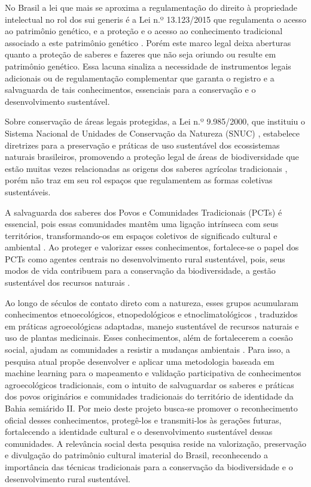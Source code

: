 No Brasil a lei que mais se aproxima a regulamentação do direito à propriedade intelectual no rol dos sui generis é a Lei n.º 13.123/2015 que regulamenta o acesso ao patrimônio genético, e a proteção e o acesso ao conhecimento tradicional associado a este patrimônio genético \cite{Brasil2015}. Porém este marco legal deixa aberturas quanto a proteção de saberes e fazeres que não seja oriundo ou resulte em patrimônio genético. Essa lacuna sinaliza a necessidade de instrumentos legais adicionais ou de regulamentação complementar que garanta o registro e a salvaguarda de tais conhecimentos, essenciais para a conservação e o desenvolvimento sustentável.

Sobre conservação de áreas legais protegidas, a Lei n.º 9.985/2000, que instituiu o Sistema Nacional de Unidades de Conservação da Natureza (SNUC) \cite{Brasil2000}, estabelece diretrizes para a preservação e práticas de uso sustentável dos ecossistemas naturais brasileiros, promovendo a proteção legal de áreas de biodiversidade que estão muitas vezes relacionadas as origens dos saberes agrícolas tradicionais \cite{Brasil2015}, porém não traz em seu rol espaços que regulamentem as formas coletivas sustentáveis.

A salvaguarda dos saberes dos Povos e Comunidades Tradicionais (PCTs) é essencial, pois essas comunidades mantêm uma ligação intrínseca com seus territórios, transformando-os em espaços coletivos de significado cultural e ambiental \cite{Gafner-Rojas2020}. Ao proteger e valorizar esses conhecimentos, fortalece-se o papel dos PCTs como agentes centrais no desenvolvimento rural sustentável, pois, seus modos de vida contribuem para a conservação da biodiversidade, a gestão sustentável dos recursos naturais \cite{Ens2016}.

Ao longo de séculos de contato direto com a natureza, esses grupos acumularam conhecimentos etnoecológicos, etnopedológicos e etnoclimatológicos \cite{Fajardo2021}, traduzidos em práticas agroecológicas adaptadas, manejo sustentável de recursos naturais e uso de plantas medicinais. Esses conhecimentos, além de fortalecerem a coesão social, ajudam as comunidades a resistir a mudanças ambientais \cite{Degryse2009}.
Para isso, a pesquisa atual propõe desenvolver e aplicar uma metodologia baseada em machine learning para o mapeamento e validação participativa de conhecimentos agroecológicos tradicionais, com o intuito de salvaguardar os saberes e práticas dos povos originários e comunidades tradicionais do território de identidade da Bahia semiárido II. Por meio deste projeto busca-se promover o reconhecimento oficial desses conhecimentos, protegê-los e transmiti-los às gerações futuras, fortalecendo a identidade cultural e o desenvolvimento sustentável dessas comunidades. A relevância social desta pesquisa reside na valorização, preservação e divulgação do patrimônio cultural imaterial do Brasil, reconhecendo a importância das técnicas tradicionais para a conservação da biodiversidade e o desenvolvimento rural sustentável.

